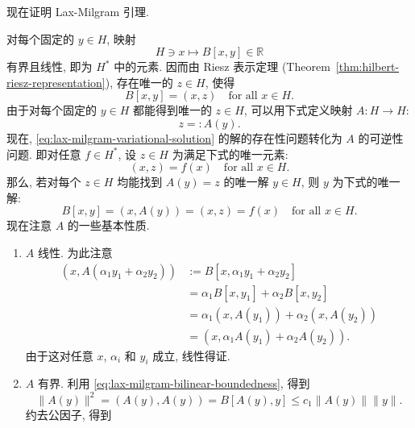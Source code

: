 现在证明 Lax-Milgram 引理.

\begin{Proof}
对每个固定的 $y\in H$, 映射
\begin{equation}\label{eq:lax-milgram-fixed-second-argument-functional}
H\ni x\mapsto B[x,y]\in\mathbb{R}
\end{equation}
有界且线性, 即为 $H^*$ 中的元素. 因而由 Riesz 表示定理 (Theorem~\ref{thm:hilbert-riesz-representation}), 存在唯一的 $z\in H$, 使得
\begin{equation}\label{eq:lax-milgram-riesz-representing-vector}
B[x,y]=(x,z)\quad\text{for all }x\in H.
\end{equation}
由于对每个固定的 $y\in H$ 都能得到唯一的 $z\in H$, 可以用下式定义映射 $A:H\to H$:
\begin{equation}\label{eq:lax-milgram-associated-operator-definition}
z=:A(y).
\end{equation}
现在, \eqref{eq:lax-milgram-variational-solution} 的解的存在性问题转化为 $A$ 的可逆性问题. 即对任意 $f\in H^*$, 设 $z\in H$ 为满足下式的唯一元素:
\begin{equation}\label{eq:lax-milgram-data-riesz-representative}
(x,z)=f(x)\quad\text{for all }x\in H.
\end{equation}
那么, 若对每个 $z\in H$ 均能找到 $A(y)=z$ 的唯一解 $y\in H$, 则 $y$ 为下式的唯一解:
\begin{equation}\label{eq:lax-milgram-operator-equation-equivalence}
B[x,y]=(x,A(y))=(x,z)=f(x)\quad\text{for all }x\in H.
\end{equation}
现在注意 $A$ 的一些基本性质.\begin{enumerate}\item $A$ 线性. 为此注意\[\begin{aligned}
(x,A(\alpha_1y_1+\alpha_2y_2))&:=B[x,\alpha_1y_1+\alpha_2y_2]\\
&=\alpha_1B[x,y_1]+\alpha_2B[x,y_2]\\
&=\alpha_1(x,A(y_1))+\alpha_2(x,A(y_2))\\
&=(x,\alpha_1A(y_1)+\alpha_2A(y_2)).
\end{aligned}\]由于这对任意 $x$, $\alpha_i$ 和 $y_i$ 成立, 线性得证.\item $A$ 有界. 利用 \eqref{eq:lax-milgram-bilinear-boundedness}, 得到
\begin{equation}\label{eq:lax-milgram-associated-operator-norm-calculation}
\|A(y)\|^2=(A(y),A(y))=B[A(y),y]\leq c_1\|A(y)\|\|y\|.
\end{equation}
约去公因子, 得到
\begin{equation}\label{eq:lax-milgram-associated-operator-upper-bound}

\end{equation}
\end{enumerate}
\end{Proof}

